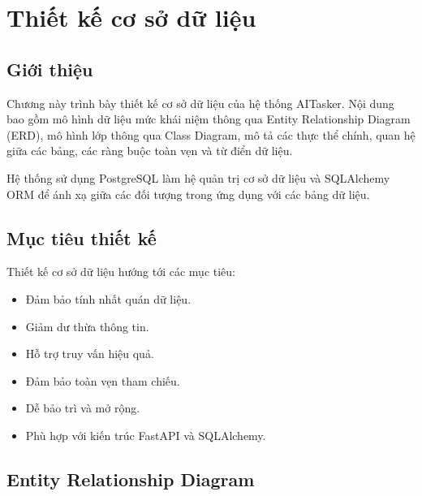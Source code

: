 %
%

\chapter{Thiết kế cơ sở dữ liệu}
\label{chap:database}

\section{Giới thiệu}
\label{sec:database-introduction}

Chương này trình bày thiết kế cơ sở dữ liệu của hệ thống AITasker. Nội dung bao gồm mô hình dữ liệu mức khái niệm thông qua Entity Relationship Diagram (ERD), mô hình lớp thông qua Class Diagram, mô tả các thực thể chính, quan hệ giữa các bảng, các ràng buộc toàn vẹn và từ điển dữ liệu.

Hệ thống sử dụng PostgreSQL làm hệ quản trị cơ sở dữ liệu và SQLAlchemy ORM để ánh xạ giữa các đối tượng trong ứng dụng với các bảng dữ liệu.

\section{Mục tiêu thiết kế}
\label{sec:database-objectives}

Thiết kế cơ sở dữ liệu hướng tới các mục tiêu:

\begin{itemize}
    \item Đảm bảo tính nhất quán dữ liệu.
    \item Giảm dư thừa thông tin.
    \item Hỗ trợ truy vấn hiệu quả.
    \item Đảm bảo toàn vẹn tham chiếu.
    \item Dễ bảo trì và mở rộng.
    \item Phù hợp với kiến trúc FastAPI và SQLAlchemy.
\end{itemize}

\section{Entity Relationship Diagram}
\label{sec:erd}

